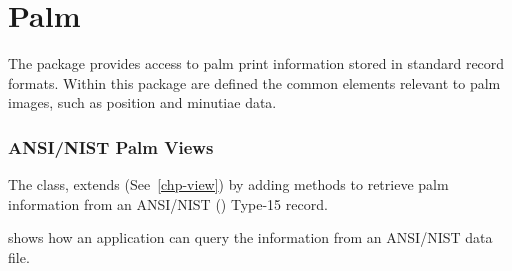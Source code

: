 %
%
\chapter{Palm}
\label{chp-palm}
The  package provides access to palm print information stored in
standard record formats. Within this package are defined the common elements
relevant to palm images, such as position and minutiae data.

\subsection{ANSI/NIST Palm Views}
The  class, extends
(See~\ref{chp-view}) by adding methods to retrieve palm information from an
ANSI/NIST (\cite{std:an2k11}) Type-15 record.

 shows how an application can query the information from
an ANSI/NIST data file.

